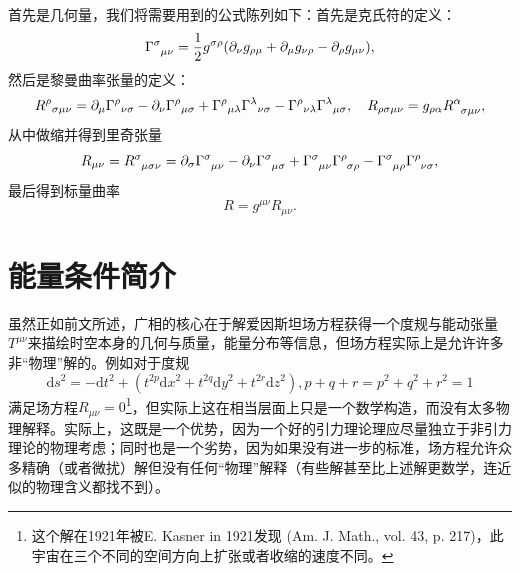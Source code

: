 \documentclass[hyperref, UTF8, a4paper]{ctexart}
\begin{document}
首先是几何量，我们将需要用到的公式陈列如下：首先是克氏符的定义：
\begin{equation}
    \Gamma\indices{^\sigma_{\mu \nu}} = \frac{1}{2} g^{\sigma \rho} (\partial_\nu g_{\rho \mu} + \partial_\mu g_{\nu \rho} - \partial_\rho g_{\mu \nu}),
\end{equation}
然后是黎曼曲率张量的定义：
\begin{equation}
    R^{\rho }{}_{\sigma \mu \nu }=\partial _{\mu }\Gamma ^{\rho }{}_{\nu \sigma }-\partial _{\nu }\Gamma ^{\rho }{}_{\mu \sigma }+\Gamma ^{\rho }{}_{\mu \lambda }\Gamma ^{\lambda }{}_{\nu \sigma }-\Gamma ^{\rho }{}_{\nu \lambda }\Gamma ^{\lambda }{}_{\mu \sigma }, \quad R_{\rho \sigma \mu \nu} = g_{\rho \alpha} R\indices{^\alpha_{\sigma \mu \nu}},
\end{equation}
从中做缩并得到里奇张量
\begin{equation}
    R_{\mu \nu} = R\indices{^\sigma_{\mu \sigma \nu}} = \partial_{\sigma} \Gamma\indices{^\sigma_{\mu \nu}} - \partial_\nu \Gamma\indices{^\sigma_{\mu \sigma}} + \Gamma\indices{^\sigma_{\mu \nu}} \Gamma\indices{^\rho_{\sigma \rho}} - \Gamma\indices{^\sigma_{\mu \rho}} \Gamma\indices{^\rho_{\nu \sigma}},
\end{equation}
最后得到标量曲率
\begin{equation}
    R = g^{\mu \nu} R_{\mu \nu}.
\end{equation}

\section{能量条件简介}

虽然正如前文所述，广相的核心在于解爱因斯坦场方程获得一个度规与能动张量$T^{\mu \nu }$来描绘时空本身的几何与质量，能量分布等信息，但场方程实际上是允许许多非“物理”解的。例如对于度规
\begin{equation*}
	\mathrm{d} s^{2} =-\mathrm{d} t^{2} +\left( t^{2p}\mathrm{d} x^{2} +t^{2q}\mathrm{d} y^{2} +t^{2r}\mathrm{d} z^{2}\right) ,p+q+r=p^{2} +q^{2} +r^{2} =1
\end{equation*}
满足场方程$R_{\mu \nu } =0$\footnote{这个解在1921年被E. Kasner in 1921发现 (Am. J. Math., vol. 43, p. 217)，此宇宙在三个不同的空间方向上扩张或者收缩的速度不同。}，但实际上这在相当层面上只是一个数学构造，而没有太多物理解释。实际上，这既是一个优势，因为一个好的引力理论理应尽量独立于非引力理论的物理考虑；同时也是一个劣势，因为如果没有进一步的标准，场方程允许众多精确（或者微扰）解但没有任何“物理”解释（有些解甚至比上述解更数学，连近似的物理含义都找不到）。
\end{document}
